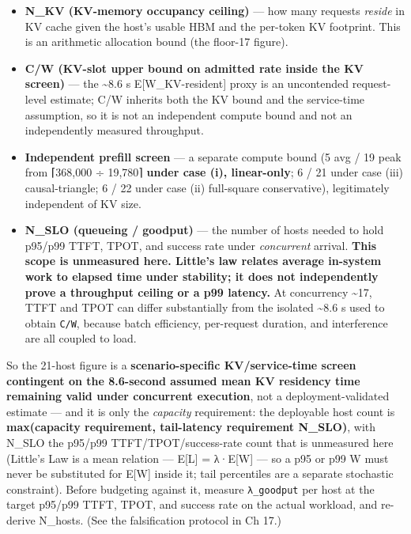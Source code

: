 \begin{itemize}
\tightlist
\item
  \textbf{N\_KV (KV-memory occupancy ceiling)} --- how many requests
  \emph{reside} in KV cache given the host's usable HBM and the
  per-token KV footprint. This is an arithmetic allocation bound (the
  floor-17 figure).
\item
  \textbf{C/W (KV-slot upper bound on admitted rate inside the KV
  screen)} --- the \textasciitilde8.6 s E{[}W\_KV-resident{]} proxy is
  an uncontended request-level estimate; C/W inherits both the KV bound
  and the service-time assumption, so it is not an independent compute
  bound and not an independently measured throughput.
\item
  \textbf{Independent prefill screen} --- a separate compute bound (5
  avg / 19 peak from ⌈368,000 ÷ 19,780⌉ \textbf{under case (i),
  linear-only}; 6 / 21 under case (iii) causal-triangle; 6 / 22 under
  case (ii) full-square conservative), legitimately independent of KV
  size.
\item
  \textbf{N\_SLO (queueing / goodput)} --- the number of hosts needed to
  hold p95/p99 TTFT, TPOT, and success rate under \emph{concurrent}
  arrival. \textbf{This scope is unmeasured here. Little's law relates
  average in-system work to elapsed time under stability; it does not
  independently prove a throughput ceiling or a p99 latency.} At
  concurrency \textasciitilde17, TTFT and TPOT can differ substantially
  from the isolated \textasciitilde8.6 s used to obtain \texttt{C/W},
  because batch efficiency, per-request duration, and interference are
  all coupled to load.
\end{itemize}

So the 21-host figure is a \textbf{scenario-specific KV/service-time
screen contingent on the 8.6-second assumed mean KV residency time
remaining valid under concurrent execution}, not a deployment-validated
estimate --- and it is only the \emph{capacity} requirement: the
deployable host count is \textbf{max(capacity requirement, tail-latency
requirement N\_SLO)}, with N\_SLO the p95/p99 TTFT/TPOT/success-rate
count that is unmeasured here (Little's Law is a mean relation ---
E\mbox{{[}L{]}} = λ·E\mbox{{[}W{]}} --- so a p95 or p99 W must never be substituted
for E\mbox{{[}W{]}} inside it; tail percentiles are a separate stochastic
constraint). Before budgeting against it, measure \texttt{λ\_goodput}
per host at the target p95/p99 TTFT, TPOT, and success rate on the
actual workload, and re-derive N\_hosts. (See the falsification protocol
in Ch 17.)


